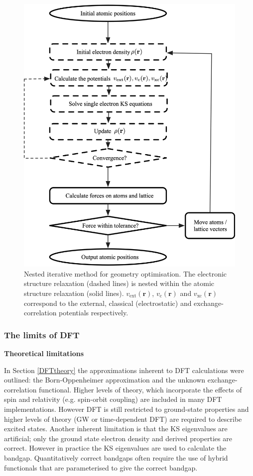 \begin{figure}[h]
\centering
  \includegraphics[width=0.7\columnwidth]{figures/ch3/scf.png}
  \caption[Nested iterative method for geometry optimisation]{Nested iterative method for geometry optimisation. The electronic structure relaxation (dashed lines) is nested within the atomic structure relaxation (solid lines). $v_\textrm{ext}(\textbf{r})$, $v_\textrm{c}(\textbf{r})$ and $v_\textrm{xc}(\textbf{r})$ correspond to the external, classical (electrostatic) and exchange-correlation potentials respectively.} 
  \label{SCF}
\end{figure}
\subsubsection{The limits of DFT}


\textbf{Theoretical limitations} 

In Section \ref{DFTtheory} the approximations inherent to DFT calculations were outlined: the Born-Oppenheimer approximation and the unknown exchange-correlation functional. Higher levels of theory, which incorporate the effects of spin and relativity (e.g. spin-orbit coupling) are included in many DFT implementations. However DFT is still restricted to ground-state properties and higher levels of theory (GW or time-dependent DFT) are required to describe excited states. Another inherent limitation is that the KS eigenvalues are artificial; only the ground state electron density and derived properties are correct. However in practice the KS eigenvalues are used to calculate the bandgap. Quantitatively correct bandgaps often require the use of hybrid functionals that are parameterised to give the correct bandgap.

